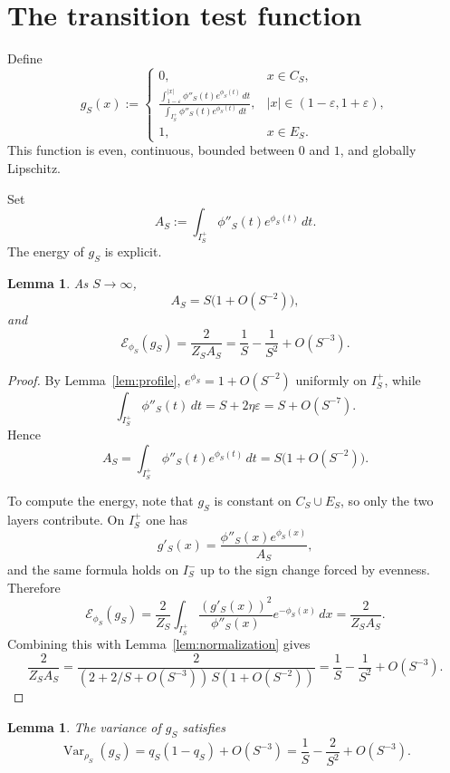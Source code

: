 \documentclass[11pt]{amsart}
\newtheorem{lemma}[theorem]{Lemma}
\theoremstyle{remark}
\DeclareMathOperator{\Var}{Var}
\begin{document}
\section{The transition test function}

Define
\begin{equation}\label{eq:g}
  g_S(x):=
  \begin{cases}
    0,& x\in C_S,\\[4pt]
    \displaystyle
    \frac{\int_{1-\varepsilon}^{|x|}\phi''_S(t)e^{\phi_S(t)}\,dt}
         {\int_{I_S^+}\phi''_S(t)e^{\phi_S(t)}\,dt},
      & |x|\in(1-\varepsilon,1+\varepsilon),\\[12pt]
    1,& x\in E_S.
  \end{cases}
\end{equation}
This function is even, continuous, bounded between $0$ and $1$, and globally
Lipschitz.

Set
\[
  A_S:=\int_{I_S^+}\phi''_S(t)e^{\phi_S(t)}\,dt.
\]
The energy of $g_S$ is explicit.

\begin{lemma}\label{lem:energy}
As $S\to\infty$,
\[
  A_S=S\bigl(1+O(S^{-2})\bigr),
\]
and
\[
  \mathcal E_{\phi_S}(g_S)
  =
  \frac{2}{Z_SA_S}
  =
  \frac{1}{S}-\frac{1}{S^2}+O(S^{-3}).
\]
\end{lemma}

\begin{proof}
By Lemma~\ref{lem:profile}, $e^{\phi_S}=1+O(S^{-2})$ uniformly on $I_S^+$,
while
\[
  \int_{I_S^+}\phi''_S(t)\,dt=S+2\eta\varepsilon=S+O(S^{-7}).
\]
Hence
\[
  A_S
  =
  \int_{I_S^+}\phi''_S(t)e^{\phi_S(t)}\,dt
  =
  S\bigl(1+O(S^{-2})\bigr).
\]

To compute the energy, note that $g_S$ is constant on $C_S\cup E_S$, so only
the two layers contribute. On $I_S^+$ one has
\[
  g'_S(x)=\frac{\phi''_S(x)e^{\phi_S(x)}}{A_S},
\]
and the same formula holds on $I_S^-$ up to the sign change forced by
evenness. Therefore
\[
  \mathcal E_{\phi_S}(g_S)
  =
  \frac{2}{Z_S}\int_{I_S^+}\frac{(g'_S(x))^2}{\phi''_S(x)}e^{-\phi_S(x)}\,dx
  =
  \frac{2}{Z_SA_S}.
\]
Combining this with Lemma~\ref{lem:normalization} gives
\[
  \frac{2}{Z_SA_S}
  =
  \frac{2}{(2+2/S+O(S^{-3}))\,S(1+O(S^{-2}))}
  =
  \frac{1}{S}-\frac{1}{S^2}+O(S^{-3}).
\]
\end{proof}

\begin{lemma}\label{lem:variance}
The variance of $g_S$ satisfies
\[
  \Var_{\rho_S}(g_S)
  =
  q_S(1-q_S)+O(S^{-3})
  =
  \frac{1}{S}-\frac{2}{S^2}+O(S^{-3}).
\]
\end{lemma}
\end{document}
